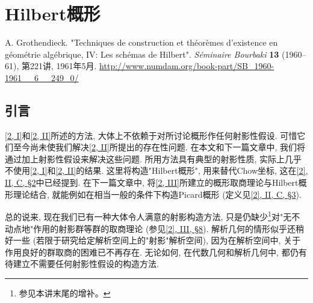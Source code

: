 \part{Hilbert概形}\label{fga3.iv}\thispagestyle{fancy}
\begin{original}{}\label{fga3.iv-original-citation}\skipsinglepar
\par{}A. Grothendieck. "Techniques de construction et théorèmes d'existence en géométrie algébrique, IV: Les schémas de Hilbert". \emph{Séminaire Bourbaki} \textbf{13} (1960–61), 第221讲, 1961年5月. \url{http://www.numdam.org/book-part/SB_1960-1961__6__249_0/}
\end{original}
\chapter{引言}\thispagestyle{fancy}\label{fga3.iv-introduction}
\par{}\hyperref[fga3.i]{[2, I]}和\hyperref[fga3.ii]{[2, II]}所述的方法, 大体上不依赖于对所讨论概形作任何射影性假设. 可惜它们至今尚未使我们解决\hyperref[fga3.ii]{[2, II]}所提出的存在性问题. 在本文和下一篇文章中, 我们将通过加上射影性假设来解决这些问题. 所用方法具有典型的射影性质, 实际上几乎不使用\hyperref[fga3.i]{[2, I]}和\hyperref[fga3.ii]{[2, II]}的结果. 这里将构造"Hilbert概形", 用来替代Chow坐标, 这在\hyperref[fga3.ii-c.2]{[2], II, C, §2}中已经提到. 在下一篇文章中, 将\hyperref[fga3.iii]{[2, III]}所建立的概形取商理论与Hilbert概形理论结合, 就能例如在相当一般的条件下构造Picard概形 (定义见\hyperref[fga3.ii-c.3]{[2], II, C, §3}).
\par{}总的说来, 现在我们已有一种大体令人满意的射影构造方法, 只是仍缺少\begingroup\renewcommand{\thefootnote}{*}\footnote{参见本讲末尾的增补。}\endgroup{}对"无不动点地"作用的射影群等群的取商理论 (参见\hyperref[fga3.iii-8]{[2], III, §8}). 解析几何的情形似乎还稍好一些 (若限于研究给定解析空间上的"射影"解析空间), 因为在解析空间中, 关于作用良好的群取商的困难已不再存在. 无论如何, 在代数几何和解析几何中, 都仍有待建立不需要任何射影性假设的构造方法.
